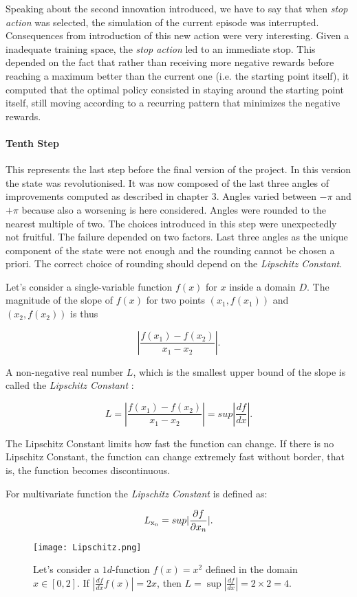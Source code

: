 Speaking about the second innovation introduced,  we have to say that when \textit{stop action} was selected, the simulation of the current episode was interrupted. Consequences from introduction of this new action were very interesting. Given a inadequate training space, the \textit{stop action} led to an immediate stop. This depended on the fact that rather than receiving more negative rewards before reaching a maximum better than the current one (i.e. the starting point itself), it computed that the optimal policy consisted in staying around the starting point itself, still moving according to a recurring pattern that minimizes the negative rewards.

\paragraph{Tenth Step} This represents the last step before the final version of the project. In this version the state was revolutionised. It was now composed of the last three angles of improvements computed as described in chapter $3$. Angles varied between $- \pi$ and $+ \pi$ because also a worsening is here considered. Angles were rounded to the nearest multiple of two. The choices introduced in this step were unexpectedly not fruitful. The failure depended on two factors. Last three angles as the unique component of the state were not enough and the rounding cannot be chosen a priori. The correct choice of rounding should depend on the \textit{Lipschitz Constant}. 

Let's consider a single-variable function $f(x)$ for $x$ inside a domain $D$. The magnitude of the slope of $f(x)$ for two points $(x_1, f(x_1))$ and $(x_2, f(x_2))$ is thus 

\begin{equation}
	|\dfrac{f(x_1)-f(x_2)}{x_1 - x_2}|.
\end{equation}

A non-negative real number $L$, which is the smallest upper bound of the slope is called the \textit{Lipschitz Constant} :

\begin{equation}
L = |\dfrac{f(x_1)-f(x_2)}{x_1 - x_2}| = sup|\dfrac{df}{dx}|.
\end{equation}

The Lipschitz Constant limits how fast the function can change. If there is no Lipschitz Constant, the function can change extremely fast without border, that is, the function becomes discontinuous\cite{Lipschitz}.

For multivariate function the \textit{Lipschitz Constant} is defined as:

\begin{equation}
L\textsubscript{x\textsubscript{n}} = sup|\dfrac{\partial f}{\partial x_n}|.
\end{equation}

\begin{figure} [h!]
	\centering
	\texttt{[image: Lipschitz.png]}
	\caption{Let's consider a $1d$-function $f(x) = x^2$ defined in the domain $x \in [0, 2]$. If $|\frac{df}{dx} f(x) | = 2x$, then $L = \sup |\frac{df}{dx}| = 2 \times 2 = 4$.}
	\label{fig:Lipschitz}
\end{figure}

